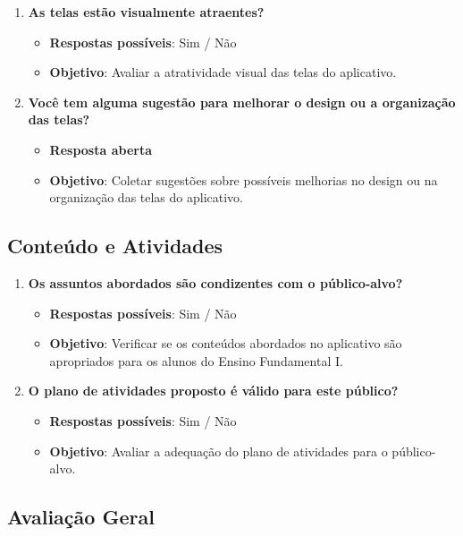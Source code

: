 \begin{enumerate}
    \item \textbf{As telas estão visualmente atraentes?}
    \begin{itemize}
        \item \textbf{Respostas possíveis}: Sim / Não
        \item \textbf{Objetivo}: Avaliar a atratividade visual das telas do aplicativo.
    \end{itemize}

    \item \textbf{Você tem alguma sugestão para melhorar o design ou a organização das telas?}
    \begin{itemize}
        \item \textbf{Resposta aberta}
        \item \textbf{Objetivo}: Coletar sugestões sobre possíveis melhorias no design ou na organização das telas do aplicativo.
    \end{itemize}
\end{enumerate}

\subsection{Conteúdo e Atividades}

\begin{enumerate}
    \item \textbf{Os assuntos abordados são condizentes com o público-alvo?}
    \begin{itemize}
        \item \textbf{Respostas possíveis}: Sim / Não
        \item \textbf{Objetivo}: Verificar se os conteúdos abordados no aplicativo são apropriados para os alunos do Ensino Fundamental I.
    \end{itemize}

    \item \textbf{O plano de atividades proposto é válido para este público?}
    \begin{itemize}
        \item \textbf{Respostas possíveis}: Sim / Não
        \item \textbf{Objetivo}: Avaliar a adequação do plano de atividades para o público-alvo.
    \end{itemize}
\end{enumerate}

\subsection{Avaliação Geral}


